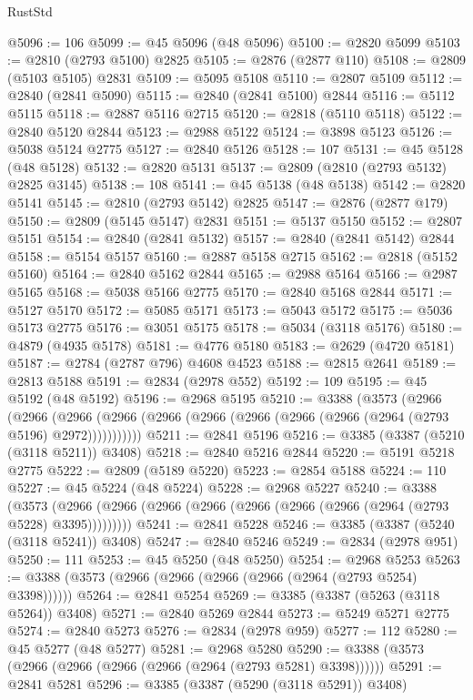 \begin{lexlean}{RustStd}
\begin{coremodule}
{\begin{coremodule}
{{{{{{{{{{{{{{{{{{{{{{{{{{{{{{{{{@5096 := 106
@5099 := @45 @5096 (@48 @5096)
@5100 := @2820 @5099
@5103 := @2810 (@2793 @5100) @2825
@5105 := @2876 (@2877 @110)
@5108 := @2809 (@5103 @5105) @2831
@5109 := @5095 @5108
@5110 := @2807 @5109
@5112 := @2840 (@2841 @5090)
@5115 := @2840 (@2841 @5100) @2844
@5116 := @5112 @5115
@5118 := @2887 @5116 @2715
@5120 := @2818 (@5110 @5118)
@5122 := @2840 @5120 @2844
@5123 := @2988 @5122
@5124 := @3898 @5123
@5126 := @5038 @5124 @2775
@5127 := @2840 @5126
@5128 := 107
@5131 := @45 @5128 (@48 @5128)
@5132 := @2820 @5131
@5137 := @2809 (@2810 (@2793 @5132) @2825 @3145)
@5138 := 108
@5141 := @45 @5138 (@48 @5138)
@5142 := @2820 @5141
@5145 := @2810 (@2793 @5142) @2825
@5147 := @2876 (@2877 @179)
@5150 := @2809 (@5145 @5147) @2831
@5151 := @5137 @5150
@5152 := @2807 @5151
@5154 := @2840 (@2841 @5132)
@5157 := @2840 (@2841 @5142) @2844
@5158 := @5154 @5157
@5160 := @2887 @5158 @2715
@5162 := @2818 (@5152 @5160)
@5164 := @2840 @5162 @2844
@5165 := @2988 @5164
@5166 := @2987 @5165
@5168 := @5038 @5166 @2775
@5170 := @2840 @5168 @2844
@5171 := @5127 @5170
@5172 := @5085 @5171
@5173 := @5043 @5172
@5175 := @5036 @5173 @2775
@5176 := @3051 @5175
@5178 := @5034 (@3118 @5176)
@5180 := @4879 (@4935 @5178)
@5181 := @4776 @5180
@5183 := @2629 (@4720 @5181)
@5187 := @2784 (@2787 @796) @4608 @4523
@5188 := @2815 @2641
@5189 := @2813 @5188
@5191 := @2834 (@2978 @552)
@5192 := 109
@5195 := @45 @5192 (@48 @5192)
@5196 := @2968 @5195
@5210 := @3388
    (@3573
      (@2966
        (@2966
          (@2966 (@2966 (@2966 (@2966 (@2966 (@2966 (@2966 (@2964 (@2793 @5196) @2972)))))))))))
@5211 := @2841 @5196
@5216 := @3385 (@3387 (@5210 (@3118 @5211)) @3408)
@5218 := @2840 @5216 @2844
@5220 := @5191 @5218 @2775
@5222 := @2809 (@5189 @5220)
@5223 := @2854 @5188
@5224 := 110
@5227 := @45 @5224 (@48 @5224)
@5228 := @2968 @5227
@5240 := @3388
    (@3573 (@2966 (@2966 (@2966 (@2966 (@2966 (@2966 (@2966 (@2964 (@2793 @5228) @3395)))))))))
@5241 := @2841 @5228
@5246 := @3385 (@3387 (@5240 (@3118 @5241)) @3408)
@5247 := @2840 @5246
@5249 := @2834 (@2978 @951)
@5250 := 111
@5253 := @45 @5250 (@48 @5250)
@5254 := @2968 @5253
@5263 := @3388 (@3573 (@2966 (@2966 (@2966 (@2966 (@2964 (@2793 @5254) @3398))))))
@5264 := @2841 @5254
@5269 := @3385 (@3387 (@5263 (@3118 @5264)) @3408)
@5271 := @2840 @5269 @2844
@5273 := @5249 @5271 @2775
@5274 := @2840 @5273
@5276 := @2834 (@2978 @959)
@5277 := 112
@5280 := @45 @5277 (@48 @5277)
@5281 := @2968 @5280
@5290 := @3388 (@3573 (@2966 (@2966 (@2966 (@2966 (@2964 (@2793 @5281) @3398))))))
@5291 := @2841 @5281
@5296 := @3385 (@3387 (@5290 (@3118 @5291)) @3408)
}}}}}}}}}}}}}}}}}}}}}}}}}}}}}}}}}
\end{coremodule}}
\end{coremodule}
\end{lexlean}
